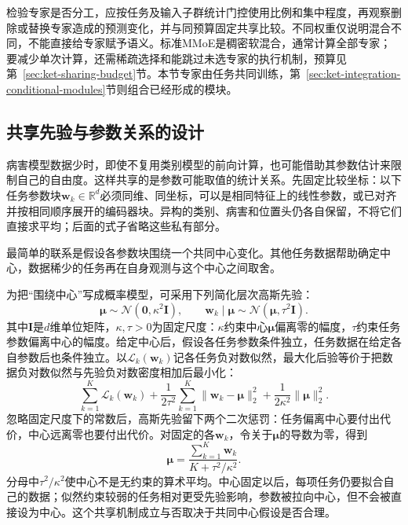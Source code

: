 检验专家是否分工，应按任务及输入子群统计门控使用比例和集中程度，再观察删除或替换专家造成的预测变化，并与同预算固定共享比较。不同权重仅说明混合不同，不能直接给专家赋予语义。标准MMoE是稠密软混合，通常计算全部专家；要减少单次计算，还需稀疏选择和能跳过未选专家的执行机制，预算见第~\ref{sec:ket-sharing-budget}节。本节专家由任务共同训练，第~\ref{sec:ket-integration-conditional-modules}节则组合已经形成的模块。

\subsection{共享先验与参数关系的设计}
\label{sec:ket-sharing-prior}

病害模型数据少时，即使不复用类别模型的前向计算，也可能借助其参数估计来限制自己的自由度。这样共享的是参数可能取值的统计关系。先固定比较坐标：以下任务参数块$\bm w_k\in\mathbb R^d$必须同维、同坐标，可以是相同特征上的线性参数，或已对齐并按相同顺序展开的编码器块。异构的类别、病害和位置头仍各自保留，不将它们直接求平均；后面的式子省略这些私有部分。

最简单的联系是假设各参数块围绕一个共同中心变化。其他任务数据帮助确定中心，数据稀少的任务再在自身观测与这个中心之间取舍。

为把“围绕中心”写成概率模型，可采用下列简化层次高斯先验：
\begin{equation}
  \bm\mu\sim\mathcal N(\bm0,\kappa^2\bm I),
  \qquad
  \bm w_k\mid\bm\mu\sim
  \mathcal N(\bm\mu,\tau^2\bm I).
  \label{eq:ket-sharing-hierarchical-prior}
\end{equation}
其中$\bm I$是$d$维单位矩阵，$\kappa,\tau>0$为固定尺度：$\kappa$约束中心$\bm\mu$偏离零的幅度，$\tau$约束任务参数偏离中心的幅度。给定中心后，假设各任务参数条件独立，任务数据在给定各自参数后也条件独立。以$\mathcal L_k(\bm w_k)$记各任务负对数似然，最大化后验等价于把数据负对数似然与先验负对数密度相加后最小化：
\begin{equation}
  \sum_{k=1}^{K}\mathcal L_k(\bm w_k)
  +\frac{1}{2\tau^2}\sum_{k=1}^{K}
     \|\bm w_k-\bm\mu\|_2^2
  +\frac{1}{2\kappa^2}\|\bm\mu\|_2^2.
  \label{eq:ket-sharing-hierarchical-map}
\end{equation}
忽略固定尺度下的常数后，高斯先验留下两个二次惩罚：任务偏离中心要付出代价，中心远离零也要付出代价。对固定的各$\bm w_k$，令关于$\bm\mu$的导数为零，得到
\begin{equation}
  \bm\mu
  =\frac{\sum_{k=1}^{K}\bm w_k}
    {K+\tau^2/\kappa^2}.
\end{equation}
分母中$\tau^2/\kappa^2$使中心不是无约束的算术平均。中心固定以后，每项任务仍要拟合自己的数据；似然约束较弱的任务相对更受先验影响，参数被拉向中心，但不会被直接设为中心。这个共享机制成立与否取决于共同中心假设是否合理。


